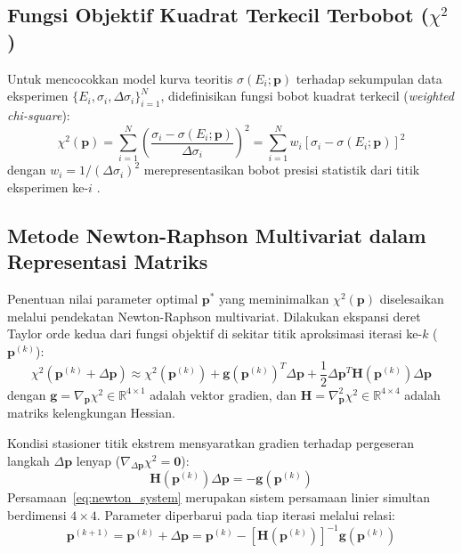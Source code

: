 \subsection*{Fungsi Objektif Kuadrat Terkecil Terbobot (\texorpdfstring{$\chi^2$}{Chi-Square})}
Untuk mencocokkan model kurva teoritis $\sigma(E_i; \mathbf{p})$ terhadap sekumpulan data eksperimen $\{E_i, \sigma_i, \Delta\sigma_i\}_{i=1}^N$, didefinisikan fungsi bobot kuadrat terkecil (\textit{weighted chi-square}):
\begin{equation}
    \chi^2(\mathbf{p}) = \sum_{i=1}^N \left( \frac{\sigma_i - \sigma(E_i; \mathbf{p})}{\Delta\sigma_i} \right)^2 = \sum_{i=1}^N w_i \left[ \sigma_i - \sigma(E_i; \mathbf{p}) \right]^2
    \label{eq:chi2}
\end{equation}
dengan $w_i = 1 / (\Delta\sigma_i)^2$ merepresentasikan bobot presisi statistik dari titik eksperimen ke-$i$ \parencite{bevington2003data}.

\subsection*{Metode Newton-Raphson Multivariat dalam Representasi Matriks}
Penentuan nilai parameter optimal $\mathbf{p}^*$ yang meminimalkan $\chi^2(\mathbf{p})$ diselesaikan melalui pendekatan Newton-Raphson multivariat. Dilakukan ekspansi deret Taylor orde kedua dari fungsi objektif di sekitar titik aproksimasi iterasi ke-$k$ ($\mathbf{p}^{(k)}$):
\begin{equation}
    \chi^2(\mathbf{p}^{(k)} + \Delta\mathbf{p}) \approx \chi^2(\mathbf{p}^{(k)}) + \mathbf{g}(\mathbf{p}^{(k)})^T \Delta\mathbf{p} + \frac{1}{2} \Delta\mathbf{p}^T \mathbf{H}(\mathbf{p}^{(k)}) \Delta\mathbf{p}
    \label{eq:taylor_chi2}
\end{equation}
dengan $\mathbf{g} = \nabla_{\mathbf{p}} \chi^2 \in \mathbb{R}^{4 \times 1}$ adalah vektor gradien, dan $\mathbf{H} = \nabla^2_{\mathbf{p}} \chi^2 \in \mathbb{R}^{4 \times 4}$ adalah matriks kelengkungan Hessian.

Kondisi stasioner titik ekstrem mensyaratkan gradien terhadap pergeseran langkah $\Delta\mathbf{p}$ lenyap ($\nabla_{\Delta\mathbf{p}} \chi^2 = \mathbf{0}$):
\begin{equation}
    \mathbf{H}(\mathbf{p}^{(k)}) \Delta\mathbf{p} = -\mathbf{g}(\mathbf{p}^{(k)})
    \label{eq:newton_system}
\end{equation}
Persamaan~\eqref{eq:newton_system} merupakan sistem persamaan linier simultan berdimensi $4 \times 4$. Parameter diperbarui pada tiap iterasi melalui relasi:
\begin{equation}
    \mathbf{p}^{(k+1)} = \mathbf{p}^{(k)} + \Delta\mathbf{p} = \mathbf{p}^{(k)} - [\mathbf{H}(\mathbf{p}^{(k)})]^{-1} \mathbf{g}(\mathbf{p}^{(k)})
    \label{eq:newton_update}
\end{equation}

